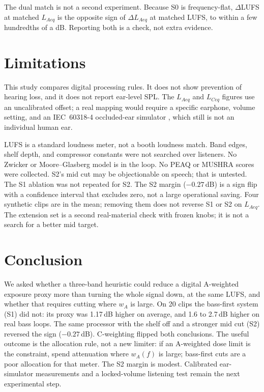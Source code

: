 \documentclass[12pt,journal,onecolumn]{IEEEtran}
\begin{document}
The dual match is not a second experiment. Because S0 is frequency-flat, $\Delta$LUFS at matched $L_{Aeq}$ is the opposite sign of $\Delta L_{Aeq}$ at matched LUFS, to within a few hundredths of a dB. Reporting both is a check, not extra evidence.

\section{Limitations}
\label{sec:limits}

This study compares digital processing rules. It does not show prevention of hearing loss, and it does not report ear-level SPL. The $L_{Aeq}$ and $L_{Ceq}$ figures use an uncalibrated offset; a real mapping would require a specific earphone, volume setting, and an IEC~60318-4 occluded-ear simulator \cite{IEC60318}, which still is not an individual human ear.

LUFS is a standard loudness meter, not a booth loudness match. Band edges, shelf depth, and compressor constants were not searched over listeners. No Zwicker or Moore--Glasberg model is in the loop. No PEAQ or MUSHRA scores were collected. S2's mid cut may be objectionable on speech; that is untested. The S1 ablation was not repeated for S2. The S2 margin ($-0.27$\,dB) is a sign flip with a confidence interval that excludes zero, not a large operational saving. Four synthetic clips are in the mean; removing them does not reverse S1 or S2 on $L_{Aeq}$. The extension set is a second real-material check with frozen knobs; it is not a search for a better mid target.

\section{Conclusion}
\label{sec:conclusion}

We asked whether a three-band heuristic could reduce a digital A-weighted exposure proxy more than turning the whole signal down, at the same LUFS, and whether that requires cutting where $w_A$ is large. On 20 clips the bass-first system (S1) did not: its proxy was 1.17\,dB higher on average, and 1.6 to 2.7\,dB higher on real bass loops. The same processor with the shelf off and a stronger mid cut (S2) reversed the sign ($-0.27$\,dB). C-weighting flipped both conclusions. The useful outcome is the allocation rule, not a new limiter: if an A-weighted dose limit is the constraint, spend attenuation where $w_A(f)$ is large; bass-first cuts are a poor allocation for that meter. The S2 margin is modest. Calibrated ear-simulator measurements and a locked-volume listening test remain the next experimental step.



\end{document}
